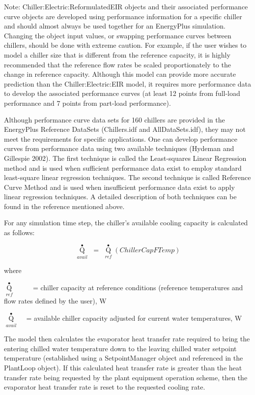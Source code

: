 Note: Chiller:Electric:ReformulatedEIR objects and their associated performance curve objects are developed using performance information for a specific chiller and should almost always be used together for an EnergyPlus simulation. Changing the object input values, or swapping performance curves between chillers, should be done with extreme caution. For example, if the user wishes to model a chiller size that is different from the reference capacity, it is highly recommended that the reference flow rates be scaled proportionately to the change in reference capacity. Although this model can provide more accurate prediction than the Chiller:Electric:EIR model, it requires more performance data to develop the associated performance curves (at least 12 points from full-load performance and 7 points from part-load performance).

Although performance curve data sets for 160 chillers are provided in the EnergyPlus Reference DataSets (Chillers.idf and AllDataSets.idf), they may not meet the requirements for specific applications. One can develop performance curves from performance data using two available techniques (Hydeman and Gillespie 2002). The first technique is called the Least-squares Linear Regression method and is used when sufficient performance data exist to employ standard least-square linear regression techniques. The second technique is called Reference Curve Method and is used when insufficient performance data exist to apply linear regression techniques. A detailed description of both techniques can be found in the reference mentioned above.

For any simulation time step, the chiller's available cooling capacity is calculated as follows:

\begin{equation}
{\mathop Q\limits^ \bullet_{avail}}\,\, = \,\,{\mathop Q\limits^ \bullet_{ref}}\left( {ChillerCapFTemp} \right)
\end{equation}

where

\({\mathop Q\limits^ \bullet_{ref}}\) ~~~~ = chiller capacity at reference conditions (reference temperatures and flow rates defined by the user), W

\({\mathop Q\limits^ \bullet_{avail}}\) ~ = available chiller capacity adjusted for current water temperatures, W

The model then calculates the evaporator heat transfer rate required to bring the entering chilled water temperature down to the leaving chilled water setpoint temperature (established using a SetpointManager object and referenced in the PlantLoop object). If this calculated heat transfer rate is greater than the heat transfer rate being requested by the plant equipment operation scheme, then the evaporator heat transfer rate is reset to the requested cooling rate.

